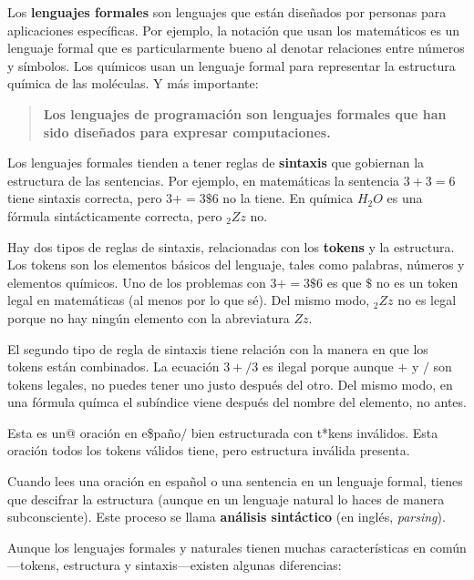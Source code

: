 \documentclass[10pt]{book}
\begin{document}
Los {\bf lenguajes formales} son lenguajes que están diseñados por personas
para aplicaciones específicas.  Por ejemplo, la notación que usan los
matemáticos es un lenguaje formal que es particularmente bueno al denotar
relaciones entre números y símbolos.  Los químicos usan un lenguaje formal
para representar la estructura química de las moléculas.  Y
más importante:

\begin{quote}
{\bf Los lenguajes de programación son lenguajes formales que han sido
diseñados para expresar computaciones.}
\end{quote}

Los lenguajes formales tienden a tener reglas de {\bf sintaxis} que
gobiernan la estructura de las sentencias.
Por ejemplo, en matemáticas la sentencia
$3 + 3 = 6$ tiene sintaxis correcta, pero
$3 + = 3 \$ 6$ no la tiene.  En química
$H_2O$ es una fórmula sintácticamente correcta, pero $_2Zz$ no.

Hay dos tipos de reglas de sintaxis, relacionadas con los {\bf tokens} y la
estructura.  Los tokens son los elementos básicos del lenguaje, tales como
palabras, números y elementos químicos.  Uno de los problemas con
$3 += 3 \$ 6$ es que \( \$ \) no es un token legal en matemáticas
(al menos por lo que sé).  Del mismo modo, $_2Zz$ no es legal porque
no hay ningún elemento con la abreviatura $Zz$.

El segundo tipo de regla de sintaxis tiene relación con la manera en que los
tokens están combinados.  La ecuación $3 +/ 3$ es ilegal porque aunque $+$
y $/$ son tokens legales, no puedes tener uno justo después del otro.
Del mismo modo, en una fórmula químca el subíndice viene después del nombre
del elemento, no antes.

Esta es un@ oración en e\$paño$/$ bien estructurada
con t*kens inválidos.  Esta oración todos los tokens válidos
tiene, pero estructura inválida presenta.

Cuando lees una oración en español o una sentencia en un lenguaje
formal, tienes que descifrar la estructura
(aunque en un lenguaje natural lo haces de manera subconsciente).  Este
proceso se llama {\bf análisis sintáctico} (en inglés, {\em parsing}).

Aunque los lenguajes formales y naturales tienen muchas características en
común---tokens, estructura y sintaxis---existen algunas
diferencias:
\end{document}
